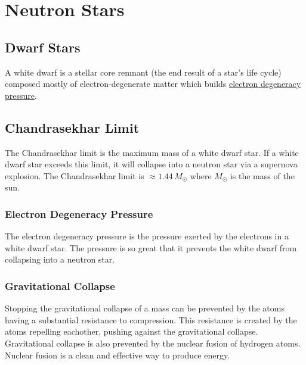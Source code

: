 \documentclass{article}
\begin{document}
\section{Neutron Stars}

\subsection{Dwarf Stars}
A white dwarf is a stellar core remnant (the end result of a star's life cycle) composed mostly of electron-degenerate matter which builds \hyperref[sec:electron_degeneracy_pressure]{electron degeneracy pressure}.

\subsection{Chandrasekhar Limit}
The Chandrasekhar limit is the maximum mass of a white dwarf star. If a white dwarf star exceeds this limit, it will collapse into a neutron star via a supernova explosion. The Chandrasekhar limit is $\approx 1.44\,M_{\odot}$ where $M_{\odot}$ is the mass of the sun.

\subsubsection{Electron Degeneracy Pressure}\label{sec:electron_degeneracy_pressure}
The electron degeneracy pressure is the pressure exerted by the electrons in a white dwarf star. The pressure is so great that it prevents the white dwarf from collapsing into a neutron star.

\subsubsection{Gravitational Collapse}
Stopping the gravitational collapse of a mass can be prevented by the atoms having a substantial resistance to compression. This resistance is created by the atoms repelling eachother, pushing against the gravitational collapse. Gravitational collapse is also prevented by the nuclear fusion of hydrogen atoms. Nuclear fusion is a clean and effective way to produce energy.
\end{document}
